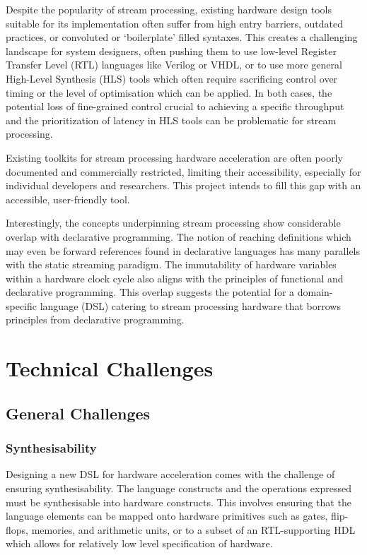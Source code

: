 Despite the popularity of stream processing, existing hardware design tools suitable for its implementation often suffer from high entry barriers, outdated practices, or convoluted or `boilerplate' filled syntaxes. This creates a challenging landscape for system designers, often pushing them to use low-level Register Transfer Level (RTL) languages like Verilog or VHDL, or to use more general High-Level Synthesis (HLS) tools which often require sacrificing control over timing or the level of optimisation which can be applied. In both cases, the potential loss of fine-grained control crucial to achieving a specific throughput and the prioritization of latency in HLS tools can be problematic for stream processing.

Existing toolkits for stream processing hardware acceleration are often poorly documented and commercially restricted, limiting their accessibility, especially for individual developers and researchers. This project intends to fill this gap with an accessible, user-friendly tool.

Interestingly, the concepts underpinning stream processing show considerable overlap with declarative programming. The notion of reaching definitions which may even be forward references found in declarative languages has many parallels with the static streaming paradigm. The immutability of hardware variables within a hardware clock cycle also aligns with the principles of functional and declarative programming. This overlap suggests the potential for a domain-specific language (DSL) catering to stream processing hardware that borrows principles from declarative programming.


\section{Technical Challenges}
\subsection{General Challenges}
\subsubsection*{Synthesisability}
Designing a new DSL for hardware acceleration comes with the challenge of ensuring synthesisability. The language constructs and the operations expressed must be synthesisable into hardware constructs. This involves ensuring that the language elements can be mapped onto hardware primitives such as gates, flip-flops, memories, and arithmetic units, or to a subset of an RTL-supporting HDL which allows for relatively low level specification of hardware.
